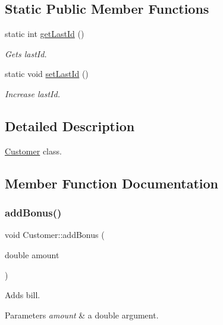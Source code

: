\subsection*{Static Public Member Functions}
\begin{DoxyCompactItemize}
\item 
static int \hyperlink{classCustomer_a8bbc27f996653fc209aef876146a2667}{get\+Last\+Id} ()
\begin{DoxyCompactList}\small\item\em Gets last\+Id. \end{DoxyCompactList}\item 
\mbox{\label{classCustomer_aaece4550faac5834bc9d7e4158eb1498}} 
static void \hyperlink{classCustomer_aaece4550faac5834bc9d7e4158eb1498}{set\+Last\+Id} ()
\begin{DoxyCompactList}\small\item\em Increase last\+Id. \end{DoxyCompactList}\end{DoxyCompactItemize}


\subsection{Detailed Description}
\hyperlink{classCustomer}{Customer} class. 

\subsection{Member Function Documentation}
\mbox{\label{classCustomer_a6bd365c7ee7c4807de7e0fb94b4a9687}} 
\subsubsection{\texorpdfstring{add\+Bonus()}{addBonus()}}
{\footnotesize\ttfamily void Customer\+::add\+Bonus (\begin{DoxyParamCaption}\item[{double}]{amount }\end{DoxyParamCaption})}



Adds bill. 


\begin{DoxyParams}{Parameters}
{\em amount} & a double argument. \\
\hline
\end{DoxyParams}
\mbox{\label{classCustomer_ae1e9fb03ed6179ecbcd6c0212bc7de17}} 

